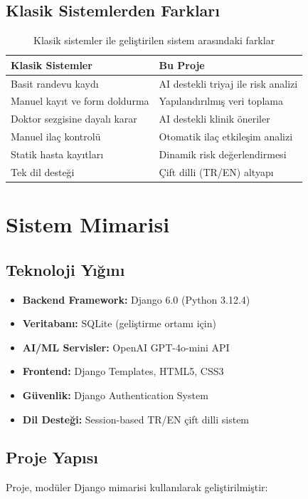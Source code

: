 \documentclass[12pt,a4paper]{article}
\begin{document}
\subsection{Klasik Sistemlerden Farkları}
\begin{table}[h!]
\centering
\begin{tabular}{|p{5cm}|p{5cm}|}
\hline
\textbf{Klasik Sistemler} & \textbf{Bu Proje} \\
\hline
Basit randevu kaydı & AI destekli triyaj ile risk analizi \\
\hline
Manuel kayıt ve form doldurma & Yapılandırılmış veri toplama \\
\hline
Doktor sezgisine dayalı karar & AI destekli klinik öneriler \\
\hline
Manuel ilaç kontrolü & Otomatik ilaç etkileşim analizi \\
\hline
Statik hasta kayıtları & Dinamik risk değerlendirmesi \\
\hline
Tek dil desteği & Çift dilli (TR/EN) altyapı \\
\hline
\end{tabular}
\caption{Klasik sistemler ile geliştirilen sistem arasındaki farklar}
\end{table}

\section{Sistem Mimarisi}

\subsection{Teknoloji Yığını}
\begin{itemize}
    \item \textbf{Backend Framework:} Django 6.0 (Python 3.12.4)
    \item \textbf{Veritabanı:} SQLite (geliştirme ortamı için)
    \item \textbf{AI/ML Servisler:} OpenAI GPT-4o-mini API
    \item \textbf{Frontend:} Django Templates, HTML5, CSS3
    \item \textbf{Güvenlik:} Django Authentication System
    \item \textbf{Dil Desteği:} Session-based TR/EN çift dilli sistem
\end{itemize}

\subsection{Proje Yapısı}
Proje, modüler Django mimarisi kullanılarak geliştirilmiştir:
\end{document}
